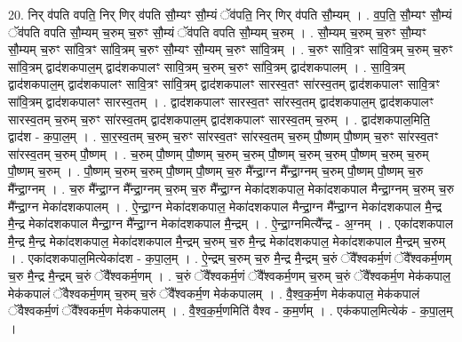 \documentclass[17pt]{extarticle}
\begin{document}
20. निर् व॑पति वपति॒ निर् णिर् व॑पति सौ॒म्यꣳ सौ॒म्यं ॅव॑पति॒ निर् णिर् व॑पति सौ॒म्यम् । . व॒प॒ति॒ सौ॒म्यꣳ सौ॒म्यं ॅव॑पति वपति सौ॒म्यम् च॒रुम् च॒रुꣳ सौ॒म्यं ॅव॑पति वपति सौ॒म्यम् च॒रुम् । . सौ॒म्यम् च॒रुम् च॒रुꣳ सौ॒म्यꣳ सौ॒म्यम् च॒रुꣳ सा॑वि॒त्रꣳ सा॑वि॒त्रम् च॒रुꣳ सौ॒म्यꣳ सौ॒म्यम् च॒रुꣳ सा॑वि॒त्रम् । . च॒रुꣳ सा॑वि॒त्रꣳ सा॑वि॒त्रम् च॒रुम् च॒रुꣳ सा॑वि॒त्रम् द्वाद॑शकपाल॒म् द्वाद॑शकपालꣳ सावि॒त्रम् च॒रुम् च॒रुꣳ सा॑वि॒त्रम् द्वाद॑शकपालम् । . सा॒वि॒त्रम् द्वाद॑शकपाल॒म् द्वाद॑शकपालꣳ सावि॒त्रꣳ सा॑वि॒त्रम् द्वाद॑शकपालꣳ सारस्व॒तꣳ सा॑रस्व॒तम् द्वाद॑शकपालꣳ सावि॒त्रꣳ सा॑वि॒त्रम् द्वाद॑शकपालꣳ सारस्व॒तम् । . द्वाद॑शकपालꣳ सारस्व॒तꣳ सा॑रस्व॒तम् द्वाद॑शकपाल॒म् द्वाद॑शकपालꣳ सारस्व॒तम् च॒रुम् च॒रुꣳ सा॑रस्व॒तम् द्वाद॑शकपाल॒म् द्वाद॑शकपालꣳ सारस्व॒तम् च॒रुम् । . द्वाद॑शकपाल॒मिति॒ द्वाद॑श - क॒पा॒ल॒म् । . सा॒र॒स्व॒तम् च॒रुम् च॒रुꣳ सा॑रस्व॒तꣳ सा॑रस्व॒तम् च॒रुम् पौ॒ष्णम् पौ॒ष्णम् च॒रुꣳ सा॑रस्व॒तꣳ सा॑रस्व॒तम् च॒रुम् पौ॒ष्णम् । . च॒रुम् पौ॒ष्णम् पौ॒ष्णम् च॒रुम् च॒रुम् पौ॒ष्णम् च॒रुम् च॒रुम् पौ॒ष्णम् च॒रुम् च॒रुम् पौ॒ष्णम् च॒रुम् । . पौ॒ष्णम् च॒रुम् च॒रुम् पौ॒ष्णम् पौ॒ष्णम् च॒रु मै᳚न्द्रा॒ग्न मै᳚न्द्रा॒ग्नम् च॒रुम् पौ॒ष्णम् पौ॒ष्णम् च॒रु मै᳚न्द्रा॒ग्नम् । . च॒रु मै᳚न्द्रा॒ग्न मै᳚न्द्रा॒ग्नम् च॒रुम् च॒रु मै᳚न्द्रा॒ग्न मेका॑दशकपाल॒ मेका॑दशकपाल मैन्द्रा॒ग्नम् च॒रुम् च॒रु मै᳚न्द्रा॒ग्न मेका॑दशकपालम् । . ऐ॒न्द्रा॒ग्न मेका॑दशकपाल॒ मेका॑दशकपाल मैन्द्रा॒ग्न मै᳚न्द्रा॒ग्न मेका॑दशकपाल मै॒न्द्र मै॒न्द्र मेका॑दशकपाल मैन्द्रा॒ग्न मै᳚न्द्रा॒ग्न मेका॑दशकपाल मै॒न्द्रम् । . ऐ॒न्द्रा॒ग्नमित्यै᳚न्द्र - अ॒ग्नम् । . एका॑दशकपाल मै॒न्द्र मै॒न्द्र मेका॑दशकपाल॒ मेका॑दशकपाल मै॒न्द्रम् च॒रुम् च॒रु मै॒न्द्र मेका॑दशकपाल॒ मेका॑दशकपाल मै॒न्द्रम् च॒रुम् । . एका॑दशकपाल॒मित्येका॑दश - क॒पा॒ल॒म् । . ऐ॒न्द्रम् च॒रुम् च॒रु मै॒न्द्र मै॒न्द्रम् च॒रुं ॅवै᳚श्वकर्म॒णं ॅवै᳚श्वकर्म॒णम् च॒रु मै॒न्द्र मै॒न्द्रम् च॒रुं ॅवै᳚श्वकर्म॒णम् । . च॒रुं ॅवै᳚श्वकर्म॒णं ॅवै᳚श्वकर्म॒णम् च॒रुम् च॒रुं ॅवै᳚श्वकर्म॒ण मेक॑कपाल॒ मेक॑कपालं ॅवैश्वकर्म॒णम् च॒रुम् च॒रुं ॅवै᳚श्वकर्म॒ण मेक॑कपालम् । . वै॒श्व॒क॒र्म॒ण मेक॑कपाल॒ मेक॑कपालं ॅवैश्वकर्म॒णं ॅवै᳚श्वकर्म॒ण मेक॑कपालम् । . वै॒श्व॒क॒र्म॒णमिति॑ वैश्व - क॒म॒र्णम् । . एक॑कपाल॒मित्येक॑ - क॒पा॒ल॒म् । \newline
\pagebreak
{}
\end{document}
